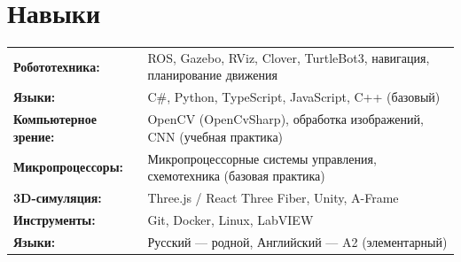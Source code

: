 \documentclass[10pt,a4paper]{article}
\begin{document}
\section{Навыки}

\begin{tabular}{p{3.5cm} p{12cm}}
    \textbf{Робототехника:} & ROS, Gazebo, RViz, Clover, TurtleBot3, навигация, планирование движения \\
    \textbf{Языки:} & C\#, Python, TypeScript, JavaScript, C++ (базовый) \\
    \textbf{Компьютерное зрение:} & OpenCV (OpenCvSharp), обработка изображений, CNN (учебная практика) \\
    \textbf{Микропроцессоры:} & Микропроцессорные системы управления, схемотехника (базовая практика) \\
    \textbf{3D-симуляция:} & Three.js / React Three Fiber, Unity, A-Frame \\
    \textbf{Инструменты:} & Git, Docker, Linux, LabVIEW \\
    \textbf{Языки:} & Русский --- родной, Английский --- A2 (элементарный)
\end{tabular}

\end{document}
